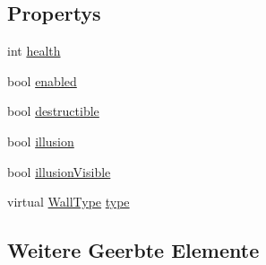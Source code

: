 \subsection*{Propertys}
\begin{DoxyCompactItemize}
\item 
int \hyperlink{class_gruppe22_1_1_backend_1_1_wall_tile_ad9338b74678b9d6865ef61590fc1a186}{health}
\item 
bool \hyperlink{class_gruppe22_1_1_backend_1_1_wall_tile_a9d96d22401e33d56e2e4c9802e358297}{enabled}
\item 
bool \hyperlink{class_gruppe22_1_1_backend_1_1_wall_tile_a053c7d5280bf0f4731bd81f295dc8ceb}{destructible}
\item 
bool \hyperlink{class_gruppe22_1_1_backend_1_1_wall_tile_a2957d011cd10b34c7c1294b508d5084b}{illusion}
\item 
bool \hyperlink{class_gruppe22_1_1_backend_1_1_wall_tile_ad8aa8c7bad2a9498707430df283e4492}{illusion\-Visible}
\item 
virtual \hyperlink{namespace_gruppe22_1_1_backend_ab19de7e2856537f39fbd380beea6ddba}{Wall\-Type} \hyperlink{class_gruppe22_1_1_backend_1_1_wall_tile_a3bc2fdbeaac290597127efef9cce32e6}{type}
\end{DoxyCompactItemize}
\subsection*{Weitere Geerbte Elemente}


